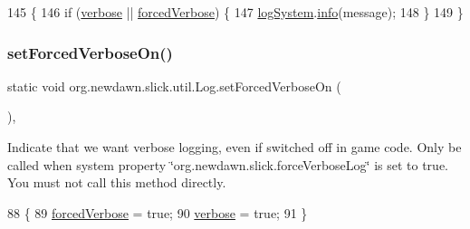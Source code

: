 \begin{DoxyCode}
145                                             \{
146         \textcolor{keywordflow}{if} (\mbox{\hyperlink{classorg_1_1newdawn_1_1slick_1_1util_1_1_log_af438e0ccf09b79bc870bd66fb9a02150}{verbose}} || \mbox{\hyperlink{classorg_1_1newdawn_1_1slick_1_1util_1_1_log_ac5c775f540d68914085b57d8ac1868f8}{forcedVerbose}}) \{
147             \mbox{\hyperlink{classorg_1_1newdawn_1_1slick_1_1util_1_1_log_acca32268a2a183e671051b4b9188cc72}{logSystem}}.\mbox{\hyperlink{interfaceorg_1_1newdawn_1_1slick_1_1util_1_1_log_system_a8430f000d206c109e47bea6a30b93be7}{info}}(message);
148         \}
149     \}
\end{DoxyCode}
\mbox{\label{classorg_1_1newdawn_1_1slick_1_1util_1_1_log_a87cd4bd74b579277c3e0a6083868b324}} 
\subsubsection{\texorpdfstring{set\+Forced\+Verbose\+On()}{setForcedVerboseOn()}}
{\footnotesize\ttfamily static void org.\+newdawn.\+slick.\+util.\+Log.\+set\+Forced\+Verbose\+On (\begin{DoxyParamCaption}{ }\end{DoxyParamCaption})\hspace{0.3cm}{\ttfamily [inline]}, {\ttfamily [static]}}

Indicate that we want verbose logging, even if switched off in game code. Only be called when system property \char`\"{}org.\+newdawn.\+slick.\+force\+Verbose\+Log\char`\"{} is set to true. You must not call this method directly. 
\begin{DoxyCode}
88                                             \{
89         \mbox{\hyperlink{classorg_1_1newdawn_1_1slick_1_1util_1_1_log_ac5c775f540d68914085b57d8ac1868f8}{forcedVerbose}} = \textcolor{keyword}{true};
90         \mbox{\hyperlink{classorg_1_1newdawn_1_1slick_1_1util_1_1_log_af438e0ccf09b79bc870bd66fb9a02150}{verbose}} = \textcolor{keyword}{true};
91     \}
\end{DoxyCode}
\mbox{\label{classorg_1_1newdawn_1_1slick_1_1util_1_1_log_a74c387a36803509c62b7b7e1e6415c1c}} 
